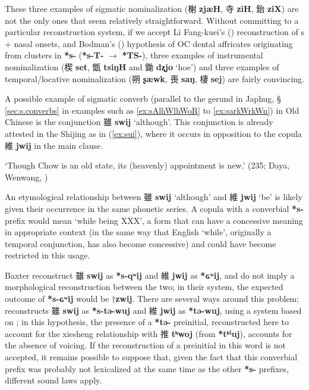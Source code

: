 \documentclass[oneside,a4paper,11pt]{article}
\newcommand{\ipa}[1]{\textbf{{\phon\mbox{#1}}}} %
\newcommand{\zh}[1]{{\cn #1}}
\newcommand{\zhc}[2]{\zh{#1} \ipa{#2}}
\begin{document}
These three examples of sigmatic nominalization  (\zhc{榭}{zjæH}, \zhc{寺}{ziH},  \zhc{鈶}{ziX}) are not the only ones that seem relatively straightforward. Without committing to a particular reconstruction system, if we accept Li Fang-kuei's (\citealt{lifk71shanggu}) reconstruction of s + nasal onsets, and Bodman's (\citeyear{bodman69sdud}) hypothesis of OC dental affricates originating from clusters in \ipa{*s-} (\ipa{*s-T-} $\rightarrow$ \ipa{*TS-}), three examples of instrumental nominalization (\zhc{楔}{set},   \zhc{甑}{tsiŋH} and \zhc{鋤}{dʐjo} ‘hoe’) and three examples of temporal/locative nominalization (\zhc{朔}{ʂæwk}, \zhc{喪}{saŋ}, \zhc{棲}{sej}) are fairly convincing.

 A possible example of sigmatic converb (parallel to the gerund in Japhug, § \ref{sec:s.converbs} in examples such as \ref{ex:sAlhWlhWoR} to \ref{ex:sarkWrkWn}) in Old Chinese is the conjunction \zhc{雖}{swij} `although'. This conjunction is already attested in the Shijing as in (\ref{ex:sui}),  where it occurs in opposition to the copula \zhc{維}{jwij}  in the main clause.
 
 \begin{exe}
\ex \label{ex:sui}
 \glt \zh{周雖舊邦，其命維新} 
 \glt `Though Chow is an old state, its (heavenly) appointment is new.' (235; Daya, Wenwang, \citealt[185]{karlgren74odes})
\end{exe}

An etymological relationship between \zhc{雖}{swij} `although' and \zhc{維}{jwij} `be' is likely given their occurrence in the same phonetic series. A copula with a converbial \ipa{*s-} prefix would mean `while being XXX', a form that can have a concessive meaning in appropriate context (in the same way that English `while', originally a temporal conjunction, has also become concessive) and could have become restricted in this usage.

Baxter reconstruct \zhc{雖}{swij} as \ipa{*s-qʷij} and \zhc{維}{jwij} as  \ipa{*ɢʷij}, and do not imply a morphological reconstruction between the two; in their system, the expected outcome of \ipa{*s-ɢʷij} would be $\dagger$\ipa{zwij}. There are several ways around this problem; \citet{jacques00ywij} reconstructs \zhc{雖}{swij} as \ipa{*s-tə-wuj} and  \zhc{維}{jwij} as  \ipa{*tə-wuj}, using a system based on \citet{sagart99roc}; in this hypothesis, the presence of a \ipa{*tə-} preinitial, reconstructed here to account for the xiesheng relationship with \zhc{推}{tʰwoj} (from \ipa{*tʰˁuj}), accounts for the absence of voicing. If the reconstruction of a preinitial in this word is not accepted, it remains possible to suppose that, given the fact that this converbial prefix was probably not lexicalized at the same time as the other \ipa{*s-} prefixes, different sound laws apply.
\end{document}
